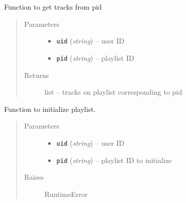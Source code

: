 \documentclass[letterpaper,10pt,english]{sphinxmanual}
\begin{document}
\begin{fulllineitems}
\begin{fulllineitems}
\begin{quote}
\begin{description}
\end{description}\end{quote}

\end{fulllineitems}


\begin{fulllineitems}
\label{code:gitsound.SpotifyUser.get_playlist_tracks}
Function to get tracks from pid
\begin{quote}\begin{description}
\item[{Parameters}] \leavevmode\begin{itemize}
\item {} 
\textbf{\texttt{uid}} (\emph{string}) -- user ID

\item {} 
\textbf{\texttt{pid}} (\emph{string}) -- playlist ID

\end{itemize}

\item[{Returns}] \leavevmode
list -- tracks on playlist corresponding to pid

\end{description}\end{quote}

\end{fulllineitems}


\begin{fulllineitems}
\label{code:gitsound.SpotifyUser.init_git_playlist}
Function to initialize playlist.
\begin{quote}\begin{description}
\item[{Parameters}] \leavevmode\begin{itemize}
\item {} 
\textbf{\texttt{uid}} (\emph{string}) -- user ID

\item {} 
\textbf{\texttt{pid}} (\emph{string}) -- playlist ID to initialize

\end{itemize}

\item[{Raises}] \leavevmode
RuntimeError


\end{description}
\end{quote}
\end{fulllineitems}
\end{fulllineitems}
\end{document}
